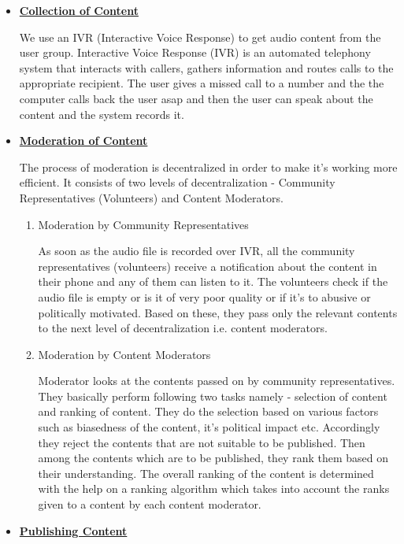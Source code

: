 \documentclass[11pt]{article}
\begin{document}
        \begin{itemize}
			\item \textbf{\underline{Collection of Content}}


			We use an IVR (Interactive Voice Response) to get audio content from the user group. Interactive Voice Response (IVR) is an automated telephony system that interacts with callers, gathers information and routes calls to the appropriate recipient. The user gives a missed call to a number and the the computer calls back the user asap and then the user can speak about the content and the system records it.


			\item \textbf{\underline{Moderation of Content}}


			The process of moderation is decentralized in order to make it's working more efficient. It consists of two levels of decentralization - Community Representatives (Volunteers) and Content Moderators.


			\begin{enumerate}
				\item Moderation by Community Representatives


			As soon as the audio file is recorded over IVR, all the community representatives (volunteers) receive a notification about the content in their phone and any of them can listen to it. The volunteers check if the audio file is empty or is it of very poor quality or if it's to abusive or politically motivated. Based on these, they pass only the relevant contents to the next level of decentralization i.e. content moderators.


				\item Moderation by Content Moderators


			Moderator looks at the contents passed on by community representatives. They basically perform following two tasks namely - selection of content and ranking of content. They do the selection based on various factors such as biasedness of the content, it's political impact etc. Accordingly they reject the contents that are not suitable to be published. Then among the contents which are to be published, they rank them based on their understanding. The overall ranking of the content is determined with the help on a ranking algorithm which takes into account the ranks given to a content by each content moderator. 
			\end{enumerate}


			\item \textbf{\underline{Publishing Content}}



\end{itemize}
\end{document}
